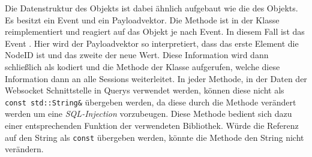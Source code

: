 Die Datenstruktur des  Objekts ist dabei ähnlich aufgebaut wie die des  Objekts.
Es besitzt ein Event und ein Payloadvektor.
Die Methode  ist in der Klasse  reimplementiert und reagiert auf das  Objekt je nach Event.
In diesem Fall ist das Event . Hier wird der Payloadvektor so interpretiert, dass das erste Element die NodeID ist und das zweite der neue Wert.
Diese Information wird dann schließlich als  kodiert und die Methode  der  Klasse aufgerufen, 
welche diese Information dann an alle Sessions weiterleitet.
In jeder Methode, in der Daten der Websocket Schnittstelle in Querys verwendet werden, können diese nicht als \texttt{const std::String&} übergeben werden, da diese durch die Methode  verändert werden um eine \emph{SQL-Injection} vorzubeugen.
Diese Methode bedient sich dazu einer entsprechenden Funktion der verwendeten Bibliothek.
Würde die Referenz auf den String als \texttt{const} übergeben werden, könnte die Methode den String nicht verändern.



